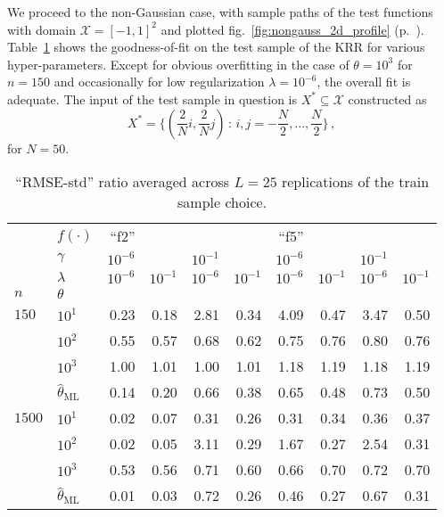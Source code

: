 \documentclass[a4paper,14pt]{extarticle}
\newcommand{\Xcal}{\mathcal{X}}
\begin{document}
We proceed to the non-Gaussian case, with sample paths of the test functions with
domain $\Xcal=[-1,1]^2$ and plotted fig.~\ref{fig:nongauss_2d_profile} (p.~\pageref{fig:nongauss_2d_profile}).
Table~\ref{tab:nongaussian_2d_gpr_fit} shows the goodness-of-fit on the test sample
of the KRR for various hyper-parameters. Except for obvious overfitting in the case
of $\theta=10^3$ for $n=150$ and occasionally for low regularization $\lambda=10^{-6}$,
the overall fit is adequate. The input of the test sample in question is $X^*\subseteq \Xcal$
constructed as
\begin{equation*}
  X^* = \bigl\{(\frac{2}{N} i, \frac{2}{N} j)\,:\,i,j = -\frac{N}{2}, \ldots, \frac{N}{2}\bigr\} \,,
\end{equation*}
for $N=50$.
\begin{table}
  \centering
  \caption{``RMSE-std'' ratio averaged across $L=25$ replications of the train sample choice.}
  \label{tab:nongaussian_2d_gpr_fit}
  \begin{tabular}{ll||rrrr|rrrr}
  \toprule
       & $f(\cdot)$ &       ``f2'' &          &          &          &       ``f5'' &          &          &          \\\cline{2-2}
       & $\gamma$ & $10^{-6}$ &          & $10^{-1}$ &          & $10^{-6}$ &          & $10^{-1}$ &          \\\cline{2-2}
       & $\lambda$ & $10^{-6}$ & $10^{-1}$ & $10^{-6}$ & $10^{-1}$ & $10^{-6}$ & $10^{-1}$ & $10^{-6}$ & $10^{-1}$ \\\cline{2-2}
  $n$ & $\theta$ &          &          &          &          &          &          &          &          \\
  \midrule
  $150$  & $10^1$ &     0.23 &     0.18 &     2.81 &     0.34 &     4.09 &     0.47 &     3.47 &     0.50 \\
       & $10^2$ &     0.55 &     0.57 &     0.68 &     0.62 &     0.75 &     0.76 &     0.80 &     0.76 \\
       & $10^3$ &     1.00 &     1.01 &     1.00 &     1.01 &     1.18 &     1.19 &     1.18 &     1.19 \\
       & $\hat{\theta}_\text{ML}$ &     0.14 &     0.20 &     0.66 &     0.38 &     0.65 &     0.48 &     0.73 &     0.50 \\
  \midrule
  $1500$ & $10^1$ &     0.02 &     0.07 &     0.31 &     0.26 &     0.31 &     0.34 &     0.36 &     0.37 \\
       & $10^2$ &     0.02 &     0.05 &     3.11 &     0.29 &     1.67 &     0.27 &     2.54 &     0.31 \\
       & $10^3$ &     0.53 &     0.56 &     0.71 &     0.60 &     0.66 &     0.70 &     0.72 &     0.70 \\
       & $\hat{\theta}_\text{ML}$ &     0.01 &     0.03 &     0.72 &     0.26 &     0.46 &     0.27 &     0.67 &     0.31 \\
  \bottomrule
  \end{tabular}
\end{table}
\end{document}
